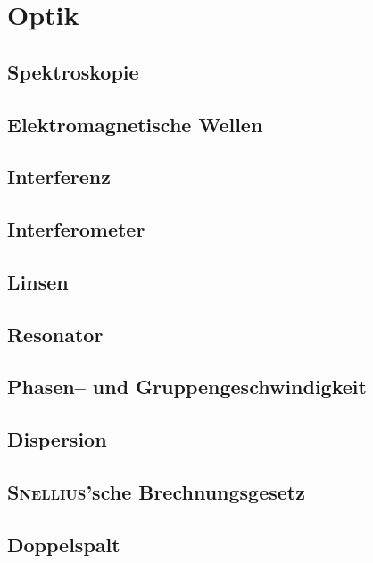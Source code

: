 \newpage
\section{Optik}
\subsection{Spektroskopie}
\subsection{Elektromagnetische Wellen}
\subsection{Interferenz}
\subsection{Interferometer}
\subsection{Linsen}
\subsection{Resonator}
\subsection{Phasen-- und Gruppengeschwindigkeit}
\subsection{Dispersion}
\subsection{\textsc{Snellius}'sche Brechnungsgesetz}
\subsection{Doppelspalt}

